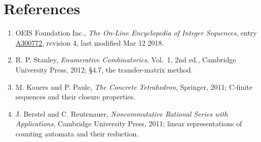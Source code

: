 \documentclass[11pt]{article}
\theoremstyle{definition}
\begin{document}
\section{References}

\begin{enumerate}

\item OEIS Foundation Inc., \emph{The On-Line Encyclopedia of Integer Sequences}, entry \href{https://oeis.org/A300772}{A300772}, revision 4, last modified Mar 12 2018.

\item R. P. Stanley, \emph{Enumerative Combinatorics}, Vol.~1, 2nd ed., Cambridge University Press, 2012; \S4.7, the transfer-matrix method.

\item M. Kauers and P. Paule, \emph{The Concrete Tetrahedron}, Springer, 2011; C-finite sequences and their closure properties.

\item J. Berstel and C. Reutenauer, \emph{Noncommutative Rational Series with Applications}, Cambridge University Press, 2011; linear representations of counting automata and their reduction.

\end{enumerate}
\end{document}
